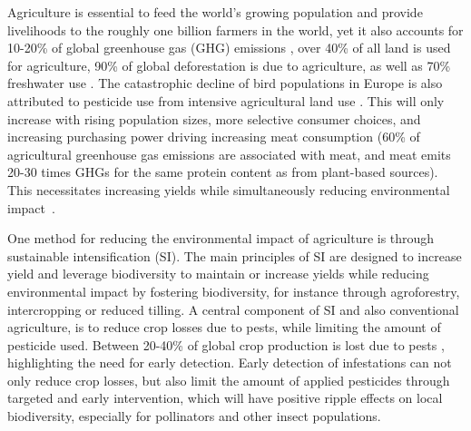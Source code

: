 Agriculture is essential to feed the world's growing  population and provide livelihoods to the roughly one billion farmers in the world, yet it also accounts for 10-20\% of  global greenhouse gas (GHG) emissions \cite{Gert-JanNabuurs2022}, over 40\% of all land is used for agriculture, 90\% of global deforestation is due to agriculture, as well as 70\% freshwater use \cite{WWF2024}. %
The catastrophic decline of bird populations in Europe is also attributed to pesticide use from intensive agricultural land use \cite{Rigal2023}.
This will only increase with rising population sizes, more selective consumer choices, and increasing purchasing power driving increasing meat consumption (60\% of agricultural greenhouse gas emissions are associated with meat, and meat emits 20-30 times GHGs for the same protein content as from plant-based sources\cite{Xu2021, Poore2018}). This necessitates increasing yields while simultaneously reducing environmental impact~\cite{McGreevy2022}.

One method for reducing the environmental impact of agriculture is through sustainable intensification (SI). The main principles of SI are designed to increase yield and leverage biodiversity to maintain or increase yields while reducing environmental impact by fostering biodiversity, for instance through agroforestry, intercropping or reduced tilling. A central component of SI and also conventional agriculture, is to reduce crop losses due to pests, while limiting the amount of pesticide used. Between 20-40\% of global crop production is lost due to pests \cite{Savary2019}, highlighting the need for early detection. Early detection of infestations can not only reduce crop losses, but also limit the amount of applied pesticides through targeted and early intervention, which will have positive ripple effects on local biodiversity, especially for pollinators and other insect populations. 

